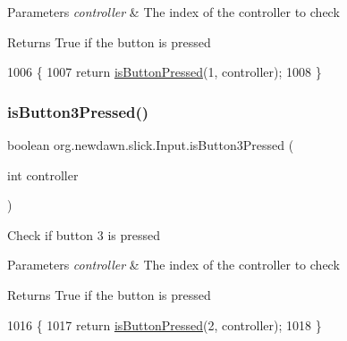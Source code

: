 \begin{DoxyParams}{Parameters}
{\em controller} & The index of the controller to check \\
\hline
\end{DoxyParams}
\begin{DoxyReturn}{Returns}
True if the button is pressed 
\end{DoxyReturn}

\begin{DoxyCode}
1006                                                     \{
1007         \textcolor{keywordflow}{return} \mbox{\hyperlink{classorg_1_1newdawn_1_1slick_1_1_input_a82287bcba0cef087bcb8a92f1bcd3d53}{isButtonPressed}}(1, controller);
1008     \}
\end{DoxyCode}
\mbox{\label{classorg_1_1newdawn_1_1slick_1_1_input_a47e301d1be0b31ee4228044f9826a458}} 
\subsubsection{\texorpdfstring{is\+Button3\+Pressed()}{isButton3Pressed()}}
{\footnotesize\ttfamily boolean org.\+newdawn.\+slick.\+Input.\+is\+Button3\+Pressed (\begin{DoxyParamCaption}\item[{int}]{controller }\end{DoxyParamCaption})\hspace{0.3cm}{\ttfamily [inline]}}

Check if button 3 is pressed


\begin{DoxyParams}{Parameters}
{\em controller} & The index of the controller to check \\
\hline
\end{DoxyParams}
\begin{DoxyReturn}{Returns}
True if the button is pressed 
\end{DoxyReturn}

\begin{DoxyCode}
1016                                                     \{
1017         \textcolor{keywordflow}{return} \mbox{\hyperlink{classorg_1_1newdawn_1_1slick_1_1_input_a82287bcba0cef087bcb8a92f1bcd3d53}{isButtonPressed}}(2, controller);
1018     \}
\end{DoxyCode}
\mbox{\label{classorg_1_1newdawn_1_1slick_1_1_input_a82287bcba0cef087bcb8a92f1bcd3d53}} 
